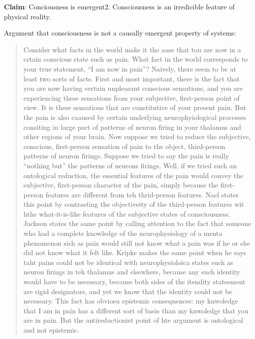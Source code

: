 \documentclass{article}
\newcommand{\tb}[1]{\textbf{#1}}
\begin{document}
\tb{Claim}: Conciousness is emergent2. Consciousness is an irredicible feature of physical reality.

Argument that consciousness is not a causally emergent property of systems:

\begin{quote}
Consider what facts in the world make it the aase that tou are now in a crtain conscious state such as pain. What fact in the world corresponds to your true statement, ``I am now in pain''? Naively, there seem to be at least two sorts of facts. First and most important, there is the fact that you are now having certain unpleasant conscious sensations, and you are experiencing these sensations from your subjective, first-person point of view. It is these sensations that are constitutive of your present pain. But the pain is also caaused by certain underlying neurophyiological processes consiting in large part of patterns of neuron firing in your thalamus and other regions of your brain. Now suppose we tried to reduce the subjective, conscious, first-person sensation of pain to the object, third-person patterns of neuron firings. Suppose we tried to say the pain is really ``nothing but'' the patterns of neurons firings. Well, if we tried such an ontological reduction, the essential features of the pain would convey the subjective, first-person character of the pain, simply because the first-person features are different from teh thrid-person features. Nael states this point by contrasting the objectiveity of the third-person features wit hthe what-it-is-like features of the subjective states of consciousness. Jackson states the same point by calling attention to the fact that someone who had a complete knowledge of the neurophysiology of a menta phenomenon sich as pain would still not know what a pain was if he or she did not know what it felt like. Kripke makes the same point when he says taht pains could not be identical with neurophysioloica states such as neuron firings in teh thalamus and elsewhere, because any such identity would have to be necessary, because both sides of the itendity statesment are rigid designators, and yet we know that the identity could not be necessary. This fact has obviosu epistemic consequences: my knwoledge that I am in pain has a different sort of basis than my knwoledge that you are in pain. But the antireductionist point of hte argument is ontological and not epistemic.
\end{quote}
\end{document}
